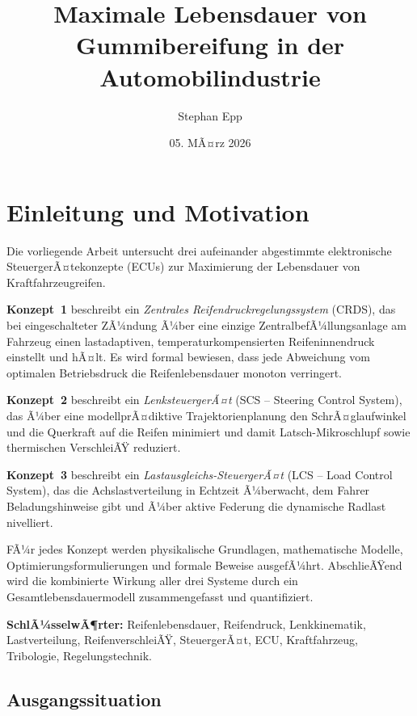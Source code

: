 ﻿\documentclass[12pt,a4paper]{article}
\title{\textbf{Maximale Lebensdauer von Gummibereifung in der Automobilindustrie}}
\author{Stephan Epp}
\date{05. MÃ¤rz 2026}
\theoremstyle{definition}
\theoremstyle{remark}
\begin{document}
\maketitle

\tableofcontents
\newpage

\section{Einleitung und Motivation}

Die vorliegende Arbeit untersucht drei aufeinander abgestimmte
elektronische SteuergerÃ¤tekonzepte (ECUs) zur Maximierung der
Lebensdauer von Kraftfahrzeugreifen.

\textbf{Konzept~1} beschreibt ein \emph{Zentrales Reifendruckregelungssystem} (CRDS),
das bei eingeschalteter ZÃ¼ndung Ã¼ber eine einzige ZentralbefÃ¼llungsanlage am Fahrzeug
einen lastadaptiven, temperaturkompensierten Reifeninnendruck einstellt und hÃ¤lt.
Es wird formal bewiesen, dass jede Abweichung vom optimalen Betriebsdruck
die Reifenlebensdauer monoton verringert.

\textbf{Konzept~2} beschreibt ein \emph{LenksteuergerÃ¤t} (SCS -- Steering Control
System), das Ã¼ber eine modellprÃ¤diktive Trajektorienplanung den SchrÃ¤glaufwinkel
und die Querkraft auf die Reifen minimiert und damit Latsch-Mikroschlupf
sowie thermischen VerschleiÃŸ reduziert.

\textbf{Konzept~3} beschreibt ein \emph{Lastausgleichs-SteuergerÃ¤t} (LCS -- Load
Control System), das die Achslastverteilung in Echtzeit Ã¼berwacht, dem Fahrer
Beladungshinweise gibt und Ã¼ber aktive Federung die dynamische Radlast
nivelliert.

FÃ¼r jedes Konzept werden physikalische Grundlagen, mathematische Modelle,
Optimierungsformulierungen und formale Beweise ausgefÃ¼hrt.
AbschlieÃŸend wird die kombinierte Wirkung aller drei Systeme durch
ein Gesamtlebensdauermodell zusammengefasst und quantifiziert.

\textbf{SchlÃ¼sselwÃ¶rter:}
Reifenlebensdauer, Reifendruck, Lenkkinematik, Lastverteilung,
ReifenverschleiÃŸ, SteuergerÃ¤t, ECU, Kraftfahrzeug, Tribologie,
Regelungstechnik.

\subsection{Ausgangssituation}
\end{document}
